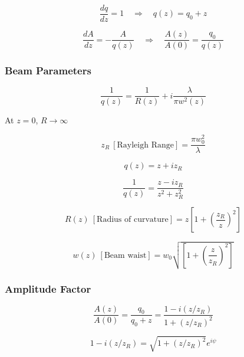 \begin{equation}
\frac{dq}{dz} = 1 \quad \Rightarrow \quad q(z) = q_0 + z
\end{equation}

\begin{equation}
\frac{dA}{dz} = -\frac{A}{q(z)}
\quad \Rightarrow \quad
\frac{A(z)}{A(0)} = \frac{q_0}{q(z)}
\end{equation}

\subsubsection*{Beam Parameters}

\begin{equation}
\frac{1}{q(z)} = \frac{1}{R(z)} + i \frac{\lambda}{\pi w^2(z)}
\end{equation}

At $z=0$, $R \to \infty$

\begin{equation}
z_R \ [\text{Rayleigh Range}]= \frac{\pi w_0^2}{\lambda}
\end{equation}

\begin{equation}
q(z) = z + i z_R
\end{equation}

\begin{equation}
\frac{1}{q(z)} = \frac{z - i z_R}{z^2 + z_R^2}
\end{equation}

\begin{equation}
R(z) \ [\text{Radius of curvature}]= z \left[ 1 + \left( \frac{z_R}{z} \right)^2 \right]
\label{eq:rad_curv}
\end{equation}

\begin{equation}
w(z) \ [\text{Beam waist}] = w_0 \sqrt{\left[ 1 + \left( \frac{z}{z_R} \right)^2 \right]}
\label{eq:beam_waist}
\end{equation}

\subsubsection*{Amplitude Factor}

\begin{equation}
\frac{A(z)}{A(0)} = \frac{q_0}{q_0 + z}
= \frac{1 - i(z/z_R)}{1 + (z/z_R)^2}
\end{equation}

\begin{equation}
1 - i(z/z_R) = \sqrt{1+(z/z_R)^2} e^{i\psi}
\end{equation}

